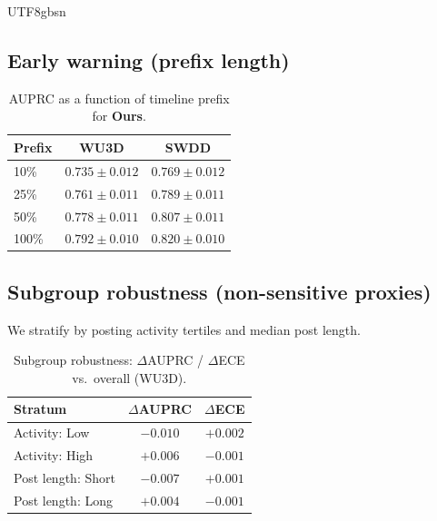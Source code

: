\documentclass[acmsmall,natbib]{acmart}
\begin{document}
\begin{CJK*}{UTF8}{gbsn}
\subsection{Early warning (prefix length)}
\begin{table}[h]
\centering
\caption{AUPRC as a function of timeline prefix for \textbf{Ours}.}
\label{tab:prefix}
\setlength{\tabcolsep}{7pt}
\begin{tabular}{lcc}
\toprule
\textbf{Prefix} & \textbf{WU3D} & \textbf{SWDD} \\
\midrule
10\% & $0.735{\pm}0.012$ & $0.769{\pm}0.012$ \\
25\% & $0.761{\pm}0.011$ & $0.789{\pm}0.011$ \\
50\% & $0.778{\pm}0.011$ & $0.807{\pm}0.011$ \\
100\% & $0.792{\pm}0.010$ & $0.820{\pm}0.010$ \\
\bottomrule
\end{tabular}
\end{table}

\subsection{Subgroup robustness (non-sensitive proxies)}
We stratify by posting activity tertiles and median post length.

\begin{table}[h]
\centering
\caption{Subgroup robustness: $\Delta$AUPRC / $\Delta$ECE vs.\ overall (WU3D).}
\label{tab:subgroups}
\setlength{\tabcolsep}{6.2pt}
\begin{tabular}{lcc}
\toprule
\textbf{Stratum} & \textbf{$\Delta$AUPRC} & \textbf{$\Delta$ECE} \\
\midrule
Activity: Low  & $-0.010$ & $+0.002$ \\
Activity: High & $+0.006$ & $-0.001$ \\
Post length: Short & $-0.007$ & $+0.001$ \\
Post length: Long  & $+0.004$ & $-0.001$ \\
\bottomrule
\end{tabular}
\end{table}



\end{CJK*}
\end{document}

